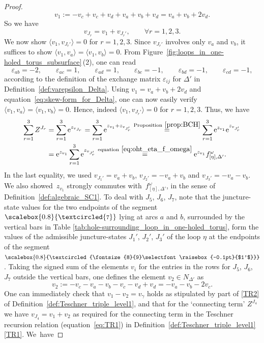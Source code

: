 \documentclass[10pt,a4paper]{amsart}
\numberwithin{equation}{section}
\theoremstyle{definition}
\newcommand{\circled}[1]{\scalebox{0.8}{\textcircled{\fontsize{8}{9}\selectfont \raisebox{-0.1pt}{#1}}}}
\begin{document}
\begin{proof}
\[
v_1 := -v_c + v_c+v_d+v_a+v_b+v_d= v_a + v_b + 2v_d.
\]
So we have
\[
v_{J_r} = v_1 + v_{J_r'}, \qquad \forall r=1,2,3.
\]
We now show $\langle v_1, v_{J_r'} \rangle=0$ for $r=1,2,3$. Since $v_{J_r'}$ involves only $v_a$ and $v_b$, it suffices to show $\langle v_1, v_a\rangle = \langle v_1 , v_b \rangle=0$. From Figure~\ref{fig:loops_in_one-holed_torus_subsurface}\,(2), one can read
\[
\varepsilon_{ab} = -2, \qquad
\varepsilon_{ac} = 1, \qquad
\varepsilon_{ad}=1, \qquad
\varepsilon_{bc}=-1,\qquad
\varepsilon_{bd}=-1,\qquad
\varepsilon_{cd}=-1,
\]
according to the definition of the exchange matrix $\varepsilon_{ij}$ for $\Delta'$ in Definition~\ref{def:varepsilon_Delta}. Using $v_1 = v_a+v_b+2v_d$ and equation~\eqref{eq:skew-form_for_Delta}, one can now easily verify $\langle v_1, v_a \rangle = \langle v_1, v_b\rangle=0$. Hence, indeed $\langle v_1,v_{J_r'}\rangle=0$ for $r=1,2,3$. Thus, we have
\begin{align*}
\sum_{r=1}^{3} Z^{J_r} & = \sum_{r=1}^{3} {\rm e}^{z_{v_{J_r}}}
= \sum_{r=1}^{3} {\rm e}^{z_{v_1} + z_{v_{J_r'}}}
 \stackrel{{\rm Proposition}~\ref{prop:BCH}}{=}
\sum_{r=1}^{3} {\rm e}^{z_{v_1}} {\rm e}^{z_{v_{J_r'}}}\\
& = {\rm e}^{z_{v_1}} \sum_{r=1}^{3} {\rm e}^{z_{v_{J_r'}}}
 \stackrel{{\rm equation}~\eqref{eq:oht_eta_f_omega}}{=}
{\rm e}^{z_{v_1}} f^\omega_{[\eta],\Delta'}.
\end{align*}
In the last equality, we used $v_{J_1'} = v_a+v_b$, $v_{J_2'} = -v_a+v_b$ and $v_{J_3'} = -v_a - v_b$. We also showed~$z_{v_1}$ strongly commutes with~$f^\omega_{[\eta],\Delta'}$, in the sense of Definition~\ref{def:algebraic_SC1}.
To deal with $J_5$, $J_6$, $J_7$, note that the juncture-state values for the two endpoints of the segment $\circled{7}$ lying at arcs $a$ and $b$, surrounded by the vertical bars in Table \ref{tab:hole-surrounding_loop_in_one-holed_torus}, form the values of the admissible juncture-states $J_1'$, $J_2'$, $J_3'$ of the loop $\eta$ at the endpoints of the segment $\circled{$1'$}$. Taking the signed sum of the elements $v_i$ for the entries in the rows for $J_5$, $J_6$, $J_7$ outside the vertical bars, one defines the element $v_2 \in N_{\Delta'}$ as
\[
v_2 := -v_c - v_a- v_b - v_c - v_d + v_d = - v_a - v_b - 2v_c.
\]
One can immediately check that $v_1 - v_2 = v_\gamma$ holds as stipulated by part of \ref{TR2} of Definition~\ref{def:Teschner_triple_level1},
and that for the `connecting term' $Z^{J_4}$ we have $v_{J_4} = v_1 + v_2$ as required for the connecting term in the Teschner recursion relation (equation~\eqref{eq:TR1}) in Definition~\ref{def:Teschner_triple_level1}\,\ref{TR1}. We~have

\end{proof}
\end{document}
